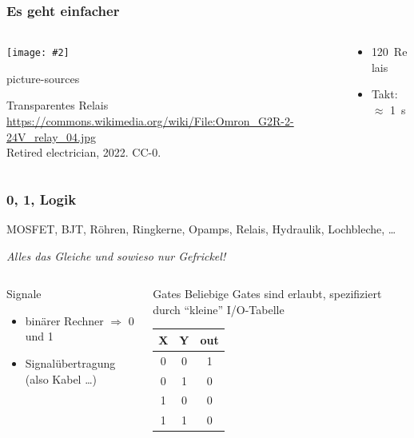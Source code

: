 \documentclass[t,aspectratio=169,usenames,dvipsnames]{beamer}
\newcommand{\sourcedimage}[5][width=\textwidth,height=0.7\textheight,keepaspectratio]{%
  \begin{center}
    \texttt{[image: \#2]}

    \expandafter\begin{collect}{picture-sources}{}{}
      \item[#3] \href{#4}{#4} \\ #5
    \end{collect}
  \end{center}
}
\begin{document}
\begin{frame}
  \frametitle{Es geht einfacher}

  \begin{columns}
    \begin{column}{.45\textwidth}
      \sourcedimage{relay-transparent}{Transparentes Relais}{https://commons.wikimedia.org/wiki/File:Omron\_G2R-2-24V\_relay\_04.jpg}{Retired electrician, 2022. CC-0.}
    \end{column}
    \begin{column}{.45\textwidth}
      \begin{itemize}
      \item \qty{120} Relais
      \item Takt: $\approx$ \qty{1}{\second}
      \end{itemize}
    \end{column}
  \end{columns}
\end{frame}

\begin{frame}
  \frametitle{0, 1, Logik}

  \begin{center}
    MOSFET, BJT, Röhren, Ringkerne, Opamps, Relais, Hydraulik, Lochbleche, \ldots

    \textit{Alles das Gleiche und sowieso nur Gefrickel!}
  \end{center}

  \begin{columns}[t]
    \begin{column}{.45\textwidth}
      \begin{block}{Signale}
        \begin{itemize}
        \item binärer Rechner $\Rightarrow$ 0 und 1\\
           
        \item Signalübertragung (also Kabel \ldots)
        \end{itemize}
      \end{block}
    \end{column}
    \begin{column}{.45\textwidth}
      \begin{block}{Gates}
        Beliebige Gates sind erlaubt, spezifiziert durch \enquote{kleine} I/O-Tabelle

        \begin{center}
          \begin{tabular}{ccc}
            X & Y & out \\
            \midrule
            0 & 0 & 1 \\
            0 & 1 & 0 \\
            1 & 0 & 0 \\
            1 & 1 & 0 \\
          \end{tabular}
        \end{center}
      \end{block}
    \end{column}
  \end{columns}
\end{frame}
\end{document}
